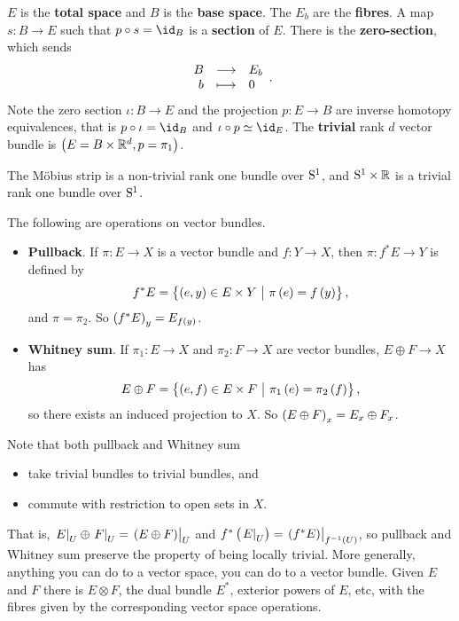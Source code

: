 \begin{notation*}
$ E $ is the \textbf{total space} and $ B $ is the \textbf{base space}. The $ E_b $ are the \textbf{fibres}. A map $ s : B \to E $ such that $ p \circ s = \id_B $ is a \textbf{section} of $ E $. There is the \textbf{zero-section}, which sends
$$ \function{B}{E_b}{b}{0}. $$
Note the zero section $ \iota : B \to E $ and the projection $ p : E \to B $ are inverse homotopy equivalences, that is $ p \circ \iota = \id_B $ and $ \iota \circ p \simeq \id_E $. The \textbf{trivial} rank $ d $ vector bundle is $ \br{E = B \times \RR^d, p = \pi_1} $.
\end{notation*}

\begin{example*}
The M\"obius strip is a non-trivial rank one bundle over $ \S^1 $, and $ \S^1 \times \RR $ is a trivial rank one bundle over $ \S^1 $.
\end{example*}

The following are operations on vector bundles.
\begin{itemize}
\item \textbf{Pullback}. If $ \pi : E \to X $ is a vector bundle and $ f : Y \to X $, then $ \pi : f^*E \to Y $ is defined by
$$ f^*E = \cbr{\br{e, y} \in E \times Y \st \pi\br{e} = f\br{y}}, $$
and $ \pi = \pi_2 $. So $ \br{f^*E}_y = E_{f\br{y}} $.
\item \textbf{Whitney sum}. If $ \pi_1 : E \to X $ and $ \pi_2 : F \to X $ are vector bundles, $ E \oplus F \to X $ has
$$ E \oplus F = \cbr{\br{e, f} \in E \times F \st \pi_1\br{e} = \pi_2\br{f}}, $$
so there exists an induced projection to $ X $. So $ \br{E \oplus F}_x = E_x \oplus F_x $.
\end{itemize}
Note that both pullback and Whitney sum
\begin{itemize}
\item take trivial bundles to trivial bundles, and
\item commute with restriction to open sets in $ X $.
\end{itemize}
That is, $ \eval{E}_U \oplus \eval{F}_U = \eval{\br{E \oplus F}}_U $ and $ f^*\br{\eval{E}_U} = \eval{\br{f^*E}}_{f^{-1}\br{U}} $, so pullback and Whitney sum preserve the property of being locally trivial. More generally, anything you can do to a vector space, you can do to a vector bundle. Given $ E $ and $ F $ there is $ E \otimes F $, the dual bundle $ E^* $, exterior powers of $ E $, etc, with the fibres given by the corresponding vector space operations.

